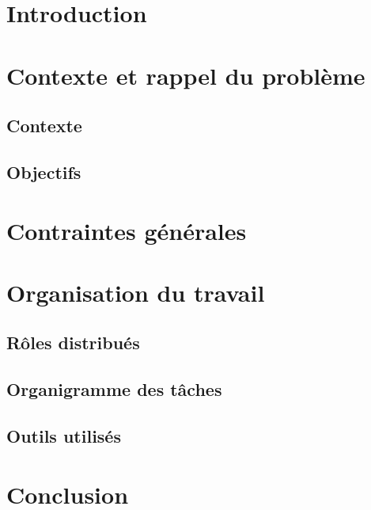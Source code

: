 


\maketitle

\section{Introduction}

\section{Contexte et rappel du problème}
\subsection{Contexte}

\subsection{Objectifs}

\section{Contraintes générales}

\section{Organisation du travail}
\subsection{Rôles distribués}

\subsection{Organigramme des tâches}

\subsection{Outils utilisés}

\section{Conclusion}

